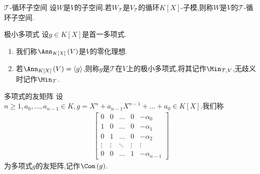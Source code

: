 \begin{definition}{$\mathcal{T}$-循环子空间}{}
	设$W$是$V$的子空间.若$W_{\mathcal{T}}$是$V_{\mathcal{T}}$的循环$K[X]$-子模,则称$W$是$V$的$\mathcal{T}$-循环子空间.
\end{definition}

\begin{definition}{极小多项式}{}
	设$g\in K[X]$是首一多项式.
	\begin{enumerate}
		\item 我们称$\Ann_{K[X]}\left(V\right)$是$V$的零化理想.
		\item 若$\Ann_{K[X]}\left(V\right)=\langle g\rangle$,则称$g$是$\mathcal{T}$在$V$上的极小多项式,将其记作$\Min_{\mathcal{T},V}$,无歧义时记作$\Min_{\mathcal{T}}$.
	\end{enumerate}
\end{definition}

\begin{definition}{多项式的友矩阵}{}
	设$n\geq 1,a_{0},\ldots,a_{n-1}\in K,g=X^{n}+a_{n-1}X^{n-1}+\ldots+a_{0}\in K[X]$.我们称
	\begin{align*}
		\begin{bmatrix}
			0 & 0 & \ldots & 0 & -\alpha_{0}\\
			1 & 0 & \ldots & 0 & -\alpha_{1}\\
			0 & 1 & \ldots & 0 & -\alpha_{2}\\
			\vdots & \vdots & \ddots & \vdots & \vdots\\
			0  & 0 & \ldots & 1 &-\alpha_{n-1}
		\end{bmatrix}
	\end{align*}
	为多项式$g$的友矩阵,记作$\Com\left(g\right)$.
\end{definition}